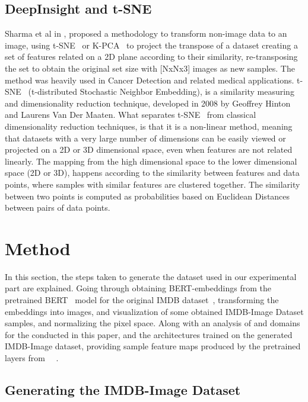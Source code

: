 \documentclass[conference]{IEEEtran}
\begin{document}
\subsection{DeepInsight and t-SNE}
                Sharma et al in \cite{deepinsight}, proposed a methodology to transform
				non-image data to an image, using t-SNE~\cite{tsne} or K-PCA~\cite{kpca} to project the transpose of a dataset creating a set of features related on a 2D plane according to their similarity, re-transposing the set to obtain the original set size with [NxNx3] images as new samples. The method was heavily used in Cancer Detection and related medical applications.
                t-SNE~\cite{tsne} (t-distributed Stochastic Neighbor Embedding), is a similarity measuring and dimensionality reduction technique, developed in 2008 by Geoffrey Hinton and Laurens Van Der Maaten. What separates t-SNE~\cite{tsne} from classical dimensionality reduction techniques, is that it is a non-linear method, meaning that datasets with a very large number of dimensions can be easily viewed or projected on a 2D or 3D dimensional space, even when features are not related linearly. The mapping from the high dimensional space to the lower dimensional space (2D or 3D), happens according to the similarity between features and data points, where samples with similar features are clustered together. The similarity between two points is computed as probabilities based on Euclidean Distances between pairs of data points. 


\section{Method}
In this section, the steps taken to generate the dataset used in our experimental part are explained. Going through obtaining BERT-embeddings from the pretrained BERT~\cite{Bert} model for the original IMDB dataset~\cite{imdb}, transforming the embeddings into images, and visualization of some obtained IMDB-Image Dataset samples, and normalizing the pixel space. Along with an analysis of  and  domains for the  conducted in this paper, and the architectures trained on the generated IMDB-Image dataset, providing sample feature maps produced by the pretrained layers from \cite{resnet}~\cite{shufflenetv2}~\cite{vgg16}.

\subsection{Generating the IMDB-Image Dataset}
\end{document}
